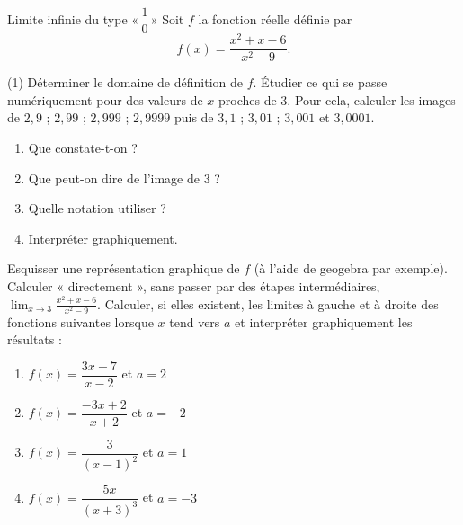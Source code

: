 \documentclass[a4paper,12pt]{article}
\begin{document}
\begin{activite}[label=acti:type10]
	Limite infinie du type $«\,\dfrac{1}{0}\,»$
	\tcblower
Soit $f$ la fonction réelle définie par
\[
f(x)=\frac{x^2+x-6}{x^2-9}.
\]

\begin{tasks}(1)
\task Déterminer le domaine de définition de $f$.
\task Étudier ce qui se passe numériquement pour des valeurs de $x$ proches de $3$. Pour cela, calculer les images de $2{,}9$ ; $2,99$ ; $2,999$ ; $2,9999$ puis de $3,1$ ; $3,01$ ; $3,001$ et $3,0001$.
\begin{multicols}{2}
\begin{enumerate}
\item Que constate-t-on ?
\item Que peut-on dire de l’image de 3 ?
\item Quelle notation utiliser ?
\item Interpréter graphiquement.
\end{enumerate}
\end{multicols}
\task Esquisser une représentation graphique de $f$ (à l’aide de geogebra par exemple).
\task Calculer « directement », sans passer par des étapes intermédiaires, $\displaystyle\lim_{x\to 3}\frac{x^2+x-6}{x^2-9}$.
\task Calculer, si elles existent, les limites à gauche et à droite des fonctions suivantes lorsque $x$ tend vers $a$ et interpréter graphiquement les résultats :
\begin{multicols}{2}
\begin{enumerate}
\item $f(x)=\dfrac{3x-7}{x-2}$ et $a=2$
\item $f(x)=\dfrac{-3x+2}{x+2}$ et $a=-2$
\item $f(x)=\dfrac{3}{(x-1)^2}$ et $a=1$
\item $f(x)=\dfrac{5x}{(x+3)^3}$ et $a=-3$
\end{enumerate}
\end{multicols}
\end{tasks}
\end{activite}
\end{document}
